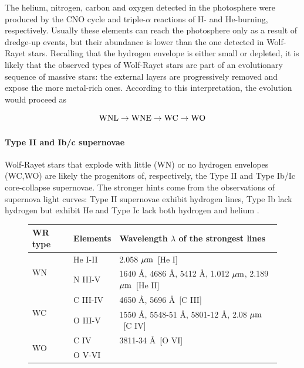 \documentclass[a4paper,titlepage]{book}     	%
\begin{document}
The helium, nitrogen, carbon and oxygen detected in the photosphere were produced by the CNO cycle and triple-$\alpha$ reactions of H- and He-burning, respectively. Usually these elements can reach the photosphere only as a result of dredge-up events, but their abundance is lower than the one detected in Wolf-Rayet stars. Recalling that the hydrogen envelope is either small or depleted, it is likely that the observed types of Wolf-Rayet stars are part of an evolutionary sequence of massive stars: the external layers are progressively removed and expose the more metal-rich ones. According to this interpretation, the evolution would proceed as

\[\rm WNL \rightarrow WNE \rightarrow WC \rightarrow WO\]

\paragraph{Type II and Ib/c supernovae} Wolf-Rayet stars that explode with little (WN) or no hydrogen envelopes (WC,WO) are likely the progenitors of, respectively, the Type II and Type Ib/Ic core-collapse supernovae. The stronger hints come from the observations of supernova light curves: Type II supernovae exhibit hydrogen lines, Type Ib lack hydrogen but exhibit He and Type Ic lack both hydrogen and helium \cite{WR_signature,parsec2015_chen,Limongi2010_preSNevo}.


\renewcommand{\arraystretch}{1.5}
\begin{figure}[h]
	\centering
		\begin{tabular}{lll}
			\toprule
			WR type & Elements & Wavelength $\lambda$ of the strongest lines \\
			\midrule
			\multirow{2}{*}{WN}  & He I-II  & 2.058 $\mu\rm m$~[He I] \\
			& N III-V & 1640 \AA , 4686 \AA, 5412 \AA, 1.012 $\mu\rm m$, 2.189 $\mu\rm m$~[He II]  \\ 
			\hline
			\multirow{2}{*}{WC}  & C III-IV  & 4650 \AA, 5696 \AA ~[C III] \\
			& O III-V & 1550 \AA,  5548-51 \AA, 5801-12 \AA, 2.08 $\mu\rm m$~[C IV] \\
			\hline
			\multirow{2}{*}{WO}  & C IV  & 3811-34 \AA~[O VI]\\
			& O V-VI & \\
			\bottomrule 	
		\end{tabular}
		 \label{tab:WRclassification}
\end{figure}
\end{document}
